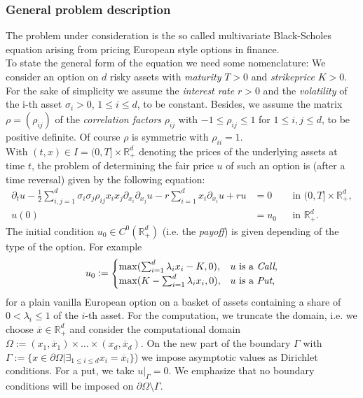 \subsubsection{General problem description}

The problem under consideration is the so called multivariate Black-Scholes equation arising from pricing European style options in finance.  \\
To state the general form of the equation we need some nomenclature: We consider an option on $d$ risky assets with {\it maturity} $T>0$ and {\it strikeprice} $K>0$. For the sake of simplicity we assume the {\it interest rate} $r>0$ and the {\it volatility} of the i-th asset $\sigma_i>0$, $1\leq i\leq d$, to be constant. Besides, we assume the matrix $\rho=(\rho_{ij})$ of the {\it correlation factors} $\rho_{ij}$ with  $-1\leq \rho_{ij}\leq 1$ for  $1\leq i,j \leq d$, to be positive definite. Of course $\rho$ is symmetric with $\rho_{ii}=1$.\\ 
With $(t,x) \in I=(0,T] \times \mathbb{R}^d_+$ denoting the prices of the underlying assets at time $t$, the problem of determining the fair price $u$ of such an option is (after a time reversal) given by the following equation:
\begin{subequations}
\begin{align} 
   \partial_t{u}-\frac12\sum_{i,j=1}^d \sigma_i\sigma_j\rho_{ij}x_ix_j \partial_{{x_i}}\partial_{x_j}u-r\sum_{i=1}^dx_i\partial_{x_i}{u}+ru&=0 &&\mbox{in } (0,T]\times \mathbb{R}_+^d,\\
   u(0)&=u_0 &&\mbox{in } \mathbb{R}_+^d.
\end{align}
\end{subequations}
The initial condition $u_0\in C^{0}\left({\mathbb{R}_+^d}\right) $ (i.e. the {\it payoff}) is given depending of the type of the option. For example
\begin{equation}
u_0 :=\begin{cases} 
\max(\sum_{i=1}^d \lambda_i x_i-K,0),&  u\text{ is a \textit{Call},}\\
\max(K-\sum_{i=1}^d\lambda_i x_i,0),& u\text{ is a \textit{Put},}
\end{cases}
\end{equation}  
for a plain vanilla European option on a basket of assets containing a share of $0<\lambda_i\leq 1$ of the $i$-th asset. For the computation, we truncate the domain, i.e. we choose $\overline x \in \mathbb{R}^d_+$ and consider the computational domain $\Omega := (x_1, \overline x_1)\times \dots \times (x_d, \overline x_d)$. On the new part of the boundary $\Gamma$ with $\Gamma :=\{x\in \partial\Omega |\exists_{1\leq i\leq d}  x_i=\overline x_i\}$) we impose asymptotic values as Dirichlet conditions. For a put, we take $u|_\Gamma=0$. We emphasize that no boundary conditions will be imposed on $\partial \Omega \setminus \Gamma$.\\
